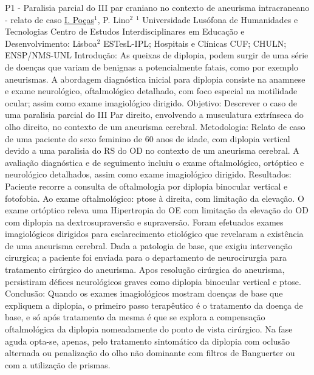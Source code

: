 
    \begin{abstract_online}{P1 - Paralisia parcial do III par craniano  no contexto de aneurisma intracraneano  - relato de caso }{%
        \underline{I. Poças}$^{1}$, P. Lino$^{2}$}{%
        }{%
        $^1$ Universidade Lusófona de Humanidades e Tecnologias Centro de Estudos Interdisciplinares em Educação e Desenvolvimento: Lisboa\newline{}$^2$ ESTesL-IPL; Hospitais e Clínicas CUF; CHULN; ENSP/NMS-UNL}
        Introdução: As queixas de diplopia, podem surgir de uma série de doenças que variam de benignas a potencialmente fatais, como por exemplo aneurismas. A abordagem diagnóstica inicial para diplopia consiste na anamnese e exame neurológico, oftalmológico detalhado, com foco especial na motilidade ocular; assim como exame imagiológico dirigido. \newline{}
        Objetivo: Descrever o caso de uma paralisia parcial do III Par direito, envolvendo a musculatura extrínseca do olho direito, no contexto de um aneurisma cerebral. 
        Metodologia:  Relato de caso de uma paciente do sexo feminino de 60 anos de idade, com diplopia vertical devido a uma paralisia do RS do OD no contexto de um aneurisma cerebral. A avaliação diagnóstica e de seguimento incluiu o exame oftalmológico, ortóptico e neurológico detalhados, assim como exame imagiológico dirigido. \newline{}Resultados: Paciente recorre a consulta de oftalmologia por diplopia binocular vertical e fotofobia. Ao exame oftalmológico: ptose à direita, com limitação da elevação. O exame ortóptico releva uma Hipertropia do OE com limitação da elevação do OD com diplopia na dextrosupraversão e supraversão. Foram efetuados exames imagiológicos dirigidos para esclarecimento etiológico que revelaram a existência de uma aneurisma cerebral. 
        Dada a patologia de base, que exigiu intervenção cirurgica; a paciente foi enviada para o departamento de neurocirurgia para tratamento  cirúrgico do aneurisma. Apos resolução  cirúrgica do aneurisma, persistiram défices neurológicos graves como diplopia binocular vertical e ptose. \newline{}
        Conclusão: Quando os exames imagiológicos mostram doenças de base que expliquem a diplopia,  o primeiro passo terapêutico é o tratamento da doença de base, e só após tratamento da mesma é que se explora a compensação oftalmológica da diplopia nomeadamente do ponto de vista cirúrgico. Na fase aguda opta-se, apenas,  pelo tratamento sintomático da diplopia com oclusão alternada ou penalização do olho não dominante com filtros de Banguerter ou  com a utilização de prismas.
    \end{abstract_online}
    